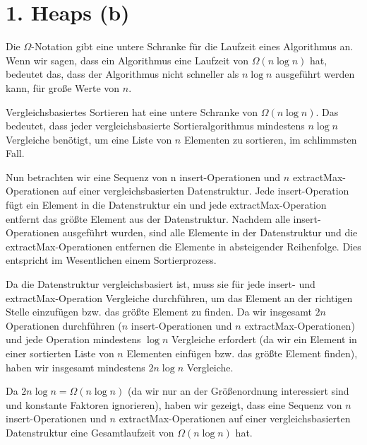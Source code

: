 \documentclass{article}
\begin{document}
\section*{1. Heaps (b)}

Die $\Omega$-Notation gibt eine untere Schranke für die Laufzeit eines Algorithmus an. Wenn wir sagen, dass ein Algorithmus eine Laufzeit von $\Omega (n \log n)$ hat, bedeutet das, dass der Algorithmus nicht schneller als $n \log n$ ausgeführt werden kann, für große Werte von $n$.

\vspace*{0.5cm}

Vergleichsbasiertes Sortieren hat eine untere Schranke von $\Omega (n \log n)$. Das bedeutet, dass jeder vergleichsbasierte Sortieralgorithmus mindestens $n \log n$ Vergleiche benötigt, um eine Liste von $n$ Elementen zu sortieren, im schlimmsten Fall.

\vspace*{0.5cm}

Nun betrachten wir eine Sequenz von n insert-Operationen und $n$ extractMax-Operationen auf einer vergleichsbasierten Datenstruktur. Jede insert-Operation fügt ein Element in die Datenstruktur ein und jede extractMax-Operation entfernt das größte Element aus der Datenstruktur. Nachdem alle insert-Operationen ausgeführt wurden, sind alle Elemente in der Datenstruktur und die extractMax-Operationen entfernen die Elemente in absteigender Reihenfolge. Dies entspricht im Wesentlichen einem Sortierprozess.

\vspace*{0.5cm}

Da die Datenstruktur vergleichsbasiert ist, muss sie für jede insert- und extractMax-Operation Vergleiche durchführen, um das Element an der richtigen Stelle einzufügen bzw. das größte Element zu finden. Da wir insgesamt $2n$ Operationen durchführen ($n$ insert-Operationen und $n$ extractMax-Operationen) und jede Operation mindestens $\log n$ Vergleiche erfordert (da wir ein Element in einer sortierten Liste von $n$ Elementen einfügen bzw. das größte Element finden), haben wir insgesamt mindestens $2n \log n$ Vergleiche.

\vspace*{0.5cm}

Da $2n \log n = \Omega(n \log n)$ (da wir nur an der Größenordnung interessiert sind und konstante Faktoren ignorieren), haben wir gezeigt, dass eine Sequenz von $n$ insert-Operationen und $n$ extractMax-Operationen auf einer vergleichsbasierten Datenstruktur eine Gesamtlaufzeit von $\Omega(n \log n)$ hat.
\end{document}
